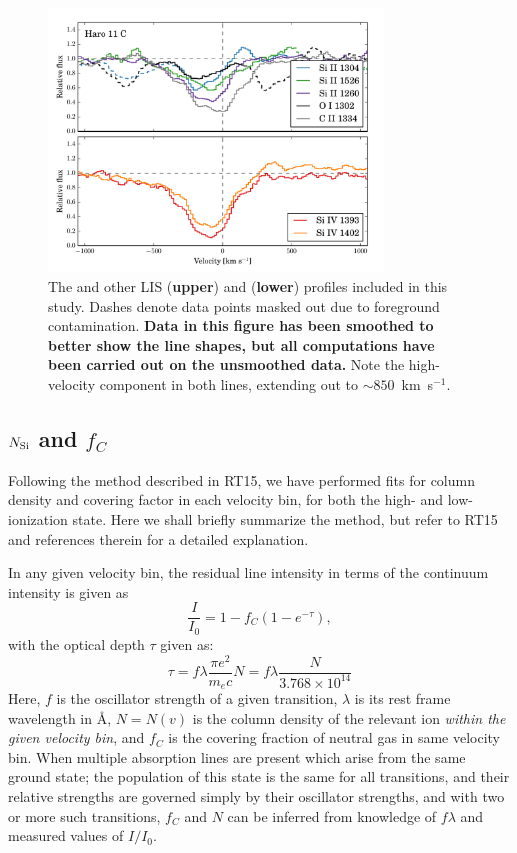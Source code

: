 \documentclass[twocolumn, trackchanges]{aastex61}
\begin{document}
\begin{figure}
\centering
\includegraphics[width=3.500in]{./HISLISProfiles.pdf}
\caption{The  and other LIS (\textbf{upper}) and 
(\textbf{lower}) profiles included in this study. Dashes denote data
points masked out due to foreground contamination. \textbf{Data in this figure has
been smoothed to better show the line shapes, but all computations have been
carried out on the unsmoothed data.} Note the
high-velocity component in both  lines, extending out to
$\sim 850$~km~s$^{-1}$.}\label{fig:SingleLines}
\end{figure}



\subsection{$N_{\rm Si}$ and $f_C$}\label{sec:aod}

Following the method described in RT15, we have performed fits for
column density and covering factor in each velocity bin, for both the
high- and low-ionization state. Here we shall briefly summarize the
method, but refer to RT15 and references therein for a detailed
explanation.

In any given velocity bin, the residual line intensity in terms of the
continuum intensity is given as
%
\begin{equation}
\label{eq:II0}
\frac{I}{I_0} = 1 - f_C (1 - e^{-\tau}),
\end{equation}
%
 with the optical depth $\tau$ given as:
%
\begin{equation}
\label{eq:tau}
\tau = f\lambda \frac{\pi e^2}{m_e c} N 
       = f\lambda \frac{N}{3.768 \times 10^{14}}
\end{equation}
%
 Here, $f$ is the oscillator strength of a given transition, $\lambda$
is its rest frame wavelength in Å, $N = N(v)$ is the column density of
the relevant ion \emph{within the given velocity bin}, and $f_{C}$ is
the covering fraction of neutral gas in same velocity bin. When multiple
absorption lines are present which arise from the same ground state; the
population of this state is the same for all transitions, and their
relative strengths are governed simply by their oscillator strengths,
and with two or more such transitions, $f_{C}$ and $N$ can be inferred
from knowledge of $f \lambda$ and measured values of $I/I_0$.
\end{document}
